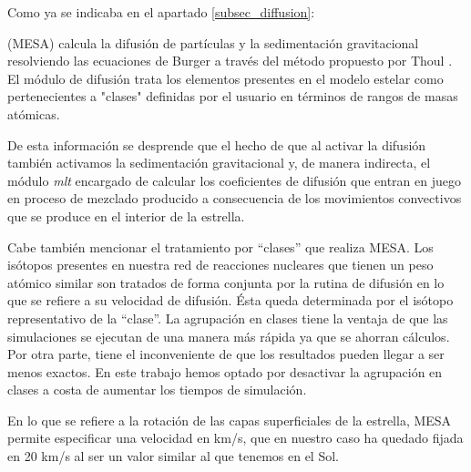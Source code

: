 Como ya se indicaba en el apartado \ref{subsec_diffusion}:
\begin{center}
    \begin{minipage}{0.9\linewidth}
        \vspace{5pt}%
        {\small
        (MESA) calcula la difusión de partículas y la sedimentación gravitacional resolviendo las ecuaciones de Burger a través del método propuesto por Thoul \cite{Thoul1993}. El módulo de difusión trata los elementos presentes en el modelo estelar como pertenecientes a "clases" definidas por el usuario en términos de rangos de masas atómicas.
        }
        \vspace{5pt}%
    \end{minipage}
\end{center}

De esta información se desprende que el hecho de que al activar la difusión también activamos la sedimentación gravitacional y, de manera indirecta, el módulo \textit{mlt} encargado de calcular los coeficientes de difusión que entran en juego en proceso de mezclado producido a consecuencia de los movimientos convectivos que se produce en el interior de la estrella.\par

Cabe también mencionar el tratamiento por “clases” que realiza MESA. Los isótopos presentes en nuestra red de reacciones nucleares que tienen un peso atómico similar son tratados de forma conjunta por la rutina de difusión en lo que se refiere a su velocidad de difusión. Ésta queda determinada por el isótopo representativo de la “clase”. La agrupación en clases tiene la ventaja de que las simulaciones se ejecutan de una manera más rápida ya que se ahorran cálculos. Por otra parte, tiene el inconveniente de que los resultados pueden llegar a ser menos exactos. En este trabajo hemos optado por desactivar la agrupación en clases a costa de aumentar los tiempos de simulación.\par

En lo que se refiere a la rotación de las capas superficiales de la estrella, MESA permite especificar una velocidad en km/s, que en nuestro caso ha quedado fijada en 20 km/s al ser un valor similar al que tenemos en el Sol.\par


